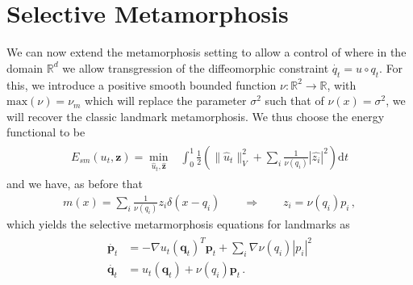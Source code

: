 \documentclass[runningheads]{llncs}
\newcommand{\half}{\frac 12}
\newcommand{\norm}[2]{\| #1 \|_{ #2 }}
\newcommand{\vnorm}[1]{\norm{ #1 }{V}}
\newcommand{\diff}[1]{\text{d} #1}
\newcommand{\Rd}{\mathbb{R}^{d}}
\begin{document}




\section{Selective Metamorphosis}\label{sec:select_mm}


We can now extend the metamorphosis setting to allow a control of where in the domain $\Rd$ 
we allow transgression of the diffeomorphic constraint $\dot{q_t} = u\circ q_t$. 
For this, we introduce a positive smooth bounded function $\nu: \mathbb R^2\to \mathbb R$, with $\mathrm{max}(\nu) = \nu_m$ which will replace the parameter $\sigma^2$ such that of $\nu(x)=\sigma^2$, we will recover the
classic landmark metamorphosis. 
We thus choose the energy functional to be
\begin{align}
  \begin{split}
    E_{sm}(u_t,\mathbf z) =\min_{\hat u_t, \hat{\mathbf z}} & \int_0^1
    \half  \left (\vnorm{\hat u_t}^2 +\sum_i \frac{1}{\nu(q_i)} |\hat{z_i}|^2\right )\diff{t}
  \end{split}
  \label{E_sm-def}
\end{align}
and we have, as before that
\begin{align}
  m(x) =  \sum_i \frac{1}{\nu(q_i)} z_i\delta(x-q_i)\qquad \Rightarrow \qquad  z_i = \nu(q_i) p_i\, , 
\end{align}
which yields the selective metarmorphosis equations for landmarks as
\begin{align}
  \begin{split}
  \dot{\mathbf p_t} &= - \nabla u_t(\mathbf q_t)^T \mathbf p_t + \sum_i \nabla \nu(q_i) |p_i|^2\\ 
  \dot{\mathbf q_t} &= u_t(\mathbf q_t) +  \nu(q_i)\mathbf p_t \,.
  \end{split}
  \label{eq-m-classic}
\end{align}
\end{document}
